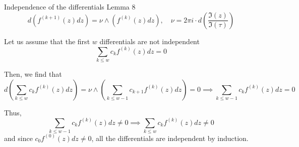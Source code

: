 \documentclass[11pt,aspectratio=169]{beamer}
\begin{document}
\begin{frame}{Independence of the differentials}{\tiny \cite{BL13} Lemma 8}
    \[d(f^{(k+1)}(z)dz) = \nu \wedge (f^{(k)}(z)dz), \quad \nu = 2\pi i \cdot d\left(\frac{\Im(z)}{\Im(\tau)}\right)\]


    Let us assume that the first $w$ differentials are not independent
    \[\sum_{k\leq w} c_{k} f^{(k)}(z) dz = 0\]


    Then, we find that
    \[ d\left(\sum_{k\leq w} c_{k} f^{(k)}(z) dz\right) = \nu \wedge \left(\sum_{k\leq w-1} c_{k+1} f^{(k)}(z) dz\right) = 0 \implies \sum_{k\leq w-1} c_{k} f^{(k)}(z) dz = 0 \]


    Thus,
    \[\sum_{k\leq w-1} c_{k} f^{(k)}(z) dz \neq 0 \implies \sum_{k\leq w} c_{k} f^{(k)}(z) dz \neq 0\]
    and since $c_0 f^{(0)}(z) dz \neq 0$, all the differentials are independent by induction.
\end{frame}
\end{document}
